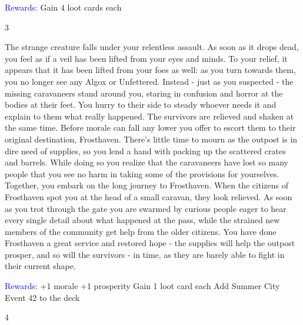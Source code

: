 \documentclass[fontsize=11pt]{scrartcl}
\begin{document}
\begin{multicols*}{3}
		\begin{center}
		  {\myfont\normalsize{\textcolor{Blue}{Rewards:}}}\newline
			\footnotesize{Gain 4 loot cards each}
		\end{center}
		\vfill\null\columnbreak
		\begin{center}
		  {\myfont\large{\textcolor{OliveGreen}{3}}}
		\end{center}
		\footnotesize{The strange creature falls under your relentless assault. As soon as it drops dead, you feel as if a veil has been lifted from your eyes and minds. To your relief, it appears that it has been lifted from your foes as well: as you turn towards them, you no longer see any Algox or Unfettered. Instead - just as you suspected - the missing caravaneers stand around you, staring in confusion and horror at the bodies at their feet. You hurry to their side to steady whoever needs it and explain to them what really happened. The survivors are relieved and shaken at the same time. Before morale can fall any lower you offer to escort them to their original destination, Frosthaven. There’s little time to mourn as the outpost is in dire need of supplies, so you lend a hand with packing up the scattered crates and barrels. While doing so you realize that the caravaneers have lost so many people that you see no harm in taking some of the provisions for yourselves. Together, you embark on the long journey to Frosthaven.\newline\newline
When the citizens of Frosthaven spot you at the head of a small caravan, they look relieved. As soon as you trot through the gate you are swarmed by curious people eager to hear every single detail about what happened at the pass, while the strained new members of the community get help from the older citizens. You have done Frosthaven a great service and restored hope - the supplies will help the outpost prosper, and so will the survivors - in time, as they are barely able to fight in their current shape.}
		\begin{center}
		  {\myfont\normalsize{\textcolor{Blue}{Rewards:}}}\newline
			\footnotesize{+1 morale\newline
+1 prosperity\newline
Gain 1 loot card each\newline
Add Summer City Event 42 to the deck}
		\end{center}
		\begin{center}
		  {\myfont\large{\textcolor{OliveGreen}{4}}}

\end{center}
\end{multicols*}
\end{document}
